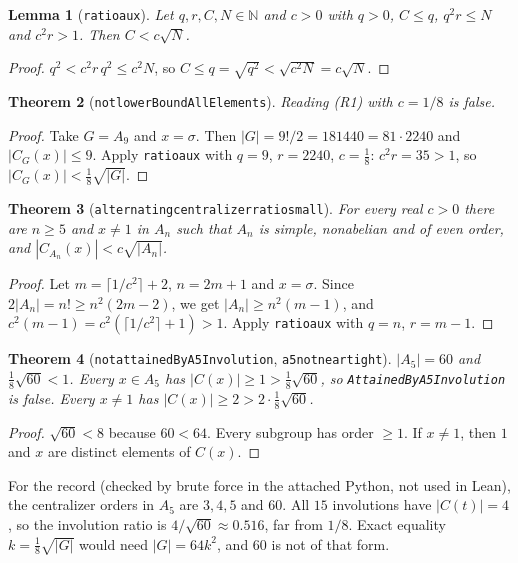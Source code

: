 \documentclass[11pt]{article}
\newtheorem{theorem}{Theorem}
\newtheorem{lemma}[theorem]{Lemma}
\theoremstyle{definition}
\theoremstyle{remark}
\renewcommand{\_}{\oldus\allowbreak}
\begin{document}
\begin{lemma}[\texttt{ratio\_aux}]
Let $q,r,C,N\in\mathbb N$ and $c>0$ with $q>0$, $C\le q$, $q^2r\le N$ and $c^2r>1$. Then $C<c\sqrt N$.
\end{lemma}
\begin{proof}
$q^2<c^2r\,q^2\le c^2N$, so $C\le q=\sqrt{q^2}<\sqrt{c^2N}=c\sqrt N$.
\end{proof}

\begin{theorem}[\texttt{not\_lowerBoundAllElements}]
Reading (R1) with $c=1/8$ is false.
\end{theorem}
\begin{proof}
Take $G=A_9$ and $x=\sigma$. Then $|G|=9!/2=181440=81\cdot2240$ and $|C_G(x)|\le 9$. Apply
\texttt{ratio\_aux} with $q=9$, $r=2240$, $c=\tfrac18$: $c^2r=35>1$, so $|C_G(x)|<\tfrac18\sqrt{|G|}$.
\end{proof}

\begin{theorem}[\texttt{alternating\_centralizer\_ratio\_small}]
For every real $c>0$ there are $n\ge5$ and $x\ne1$ in $A_n$ such that $A_n$ is simple, nonabelian and of even
order, and $|C_{A_n}(x)|<c\sqrt{|A_n|}$.
\end{theorem}
\begin{proof}
Let $m=\lceil 1/c^2\rceil+2$, $n=2m+1$ and $x=\sigma$. Since $2|A_n|=n!\ge n^2(2m-2)$, we get
$|A_n|\ge n^2(m-1)$, and $c^2(m-1)=c^2(\lceil 1/c^2\rceil+1)>1$. Apply \texttt{ratio\_aux} with
$q=n$, $r=m-1$.
\end{proof}

\begin{theorem}[\texttt{not\_attainedByA5Involution}, \texttt{a5\_not\_near\_tight}]
$|A_5|=60$ and $\tfrac18\sqrt{60}<1$. Every $x\in A_5$ has $|C(x)|\ge1>\tfrac18\sqrt{60}$, so
\texttt{AttainedByA5Involution} is false. Every $x\ne1$ has $|C(x)|\ge2>2\cdot\tfrac18\sqrt{60}$.
\end{theorem}
\begin{proof}
$\sqrt{60}<8$ because $60<64$. Every subgroup has order $\ge1$. If $x\ne1$, then $1$ and $x$ are distinct
elements of $C(x)$.
\end{proof}

For the record (checked by brute force in the attached Python, not used in Lean), the centralizer orders in
$A_5$ are $3,4,5$ and $60$. All $15$ involutions have $|C(t)|=4$, so the involution ratio is
$4/\sqrt{60}\approx0.516$, far from $1/8$. Exact equality $k=\tfrac18\sqrt{|G|}$ would need
$|G|=64k^2$, and $60$ is not of that form.
\end{document}
